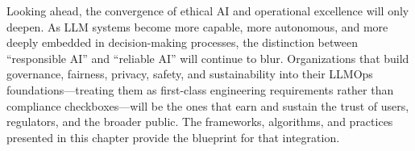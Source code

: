 Looking ahead, the convergence of ethical AI and operational excellence will only deepen. As LLM systems become more capable, more autonomous, and more deeply embedded in decision-making processes, the distinction between ``responsible AI'' and ``reliable AI'' will continue to blur. Organizations that build governance, fairness, privacy, safety, and sustainability into their LLMOps foundations---treating them as first-class engineering requirements rather than compliance checkboxes---will be the ones that earn and sustain the trust of users, regulators, and the broader public. The frameworks, algorithms, and practices presented in this chapter provide the blueprint for that integration.

\printbibliography[
  heading=subbibliography,
  segment=\therefsegment,
  resetnumbers=true
]
